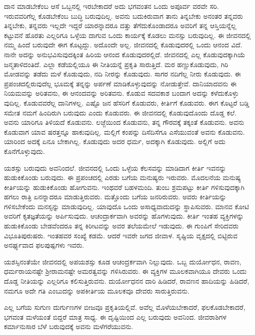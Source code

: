 ದಾನ ಮಾಡಬೇಕೆಂಬ ಆಸೆ ಒಬ್ಬನಲ್ಲಿ ಇರಬೇಕಾದರೆ ಅದು ಭಗವಂತನ ಒಂದು ಅಪೂರ್ವ ವರವೇ ಸರಿ. ಇರುವವರಿಗೆಲ್ಲ ಕೊಡಬೇಕೆಂಬ ಬುದ್ಧಿ ಬರುವುದಿಲ್ಲ. ಅವನು ಬದುಕಿರುವಾಗ ತಾನು ತಿನ್ನಬೇಕು ಅನಂತರ ತನ್ನವರು ತಿನ್ನಬೇಕು, ತನ್ನವರು ಇಲ್ಲದೇ ಇದ್ದರೆ ಯಾರನ್ನಾದರೂ ದತ್ತು ತೆಗೆದುಕೊಂಡಾದರೂ ಅವರಿಗೆ ತನ್ನ ಆಸ್ತಿಯನ್ನೆಲ್ಲ ಕಟ್ಟುವನೆ ಹೊರತು ಎಲ್ಲರಿಗೂ ಒಳ್ಳೆಯ ದಾಗುವ ಒಂದು ಕಾರ್ಯಕ್ಕೆ ಕೊಡಲು ಮನಸ್ಸು ಬರುವುದಿಲ್ಲ. ಈ ಜೀವನದಲ್ಲಿ ನಮ್ಮ ಹಿಂದೆ ಬರುವುದೇ ಈಗ ಕೊಟ್ಟದ್ದು. ಅದೊಂದೇ ಅಲ್ಲ. ಜೀವನದಲ್ಲಿ ಕೊಡುವುದರಲ್ಲಿ ಒಂದು ಆನಂದ ವಿದೆ. ನಾನೇ ಅದನ್ನು ಅನುಭವಿಸುವುದಕ್ಕಿಂತ ಹಿರಿಯ ಆನಂದ ಕೊಡುವುದರಲ್ಲಿದೆ. ಜೀವನದಲ್ಲಿ ಎಲ್ಲ ಕೊಡುವುದಕ್ಕಾಗಿಯೆ ಜನ್ಮತಾಳಿದಂತಿದೆ. ಎಲ್ಲಾ ಕಡೆಯಲ್ಲಿಯೂ ಈ ನೀತಿಯನ್ನೆ ಪ್ರಕೃತಿ ಸಾರುತ್ತಿದೆ. ಮರ ಹಣ್ಣುಕೊಡುವುದು, ಗಿರಿ ಮೋಡವನ್ನು ತಡೆದು ಮಳೆ ಕೊಡುವುದು, ನದಿ ನೀರನ್ನು ಕೊಡುವುದು. ಸಾಗರ ನದಿಗೆಲ್ಲ ನೀರು ಕೊಡುವುದು. ಈ ಪ್ರಪಂಚದಲ್ಲಿರುವುದೆಲ್ಲ ಭೂಮಕ್ಕೆ ತನ್ನನ್ನು ಅರ್ಪಣೆ ಮಾಡಿಕೊಳ್ಳುವುದನ್ನು ನೋಡುತ್ತೇವೆ. ದಾನಿಯಾದವನು ಈ ನಿಯಮವನ್ನು ಅರಿತವನು, ಈ ಆನಂದವನ್ನು ಅರಿತವನು. ಕೊಡುವ ಸದವಕಾಶ ಬಂದಾಗ ಅದನ್ನು ಕಳೆದುಕೊಳ್ಳು ವುದಿಲ್ಲ. ಕೊಡುವವರೆಲ್ಲ ದಾನಿಗಳಲ್ಲ. ಎಷ್ಟೊ ಜನ ಹೆಸರಿಗೆ ಕೊಡುವರು, ಕೀರ್ತಿಗೆ ಕೊಡುವರು. ಈಗ ಕೊಟ್ಟರೆ ಬಡ್ಡಿ ಸಮೇತ ನಮಗೆ ಹಿಂದಿರುಗಿ ಬರುವುದು ಎಂದು ಕೊಡುವರು. ಈ ಜೀವನದಲ್ಲಿ ಕೊಡುವುದೊಂದು ದೊಡ್ಡ ಕಲೆ. ಅವನು ಯಾರಿಗೂ ತಿಳಿಯದೆ ಕೊಡುವನು. ಲಜ್ಜೆಯಿಂದ ಕೊಡುವನು, ತನ್ನ ಗೌರವಕ್ಕೆ ತಕ್ಕಂತೆ ಕೊಡುವನು. ಅವನು ಕೊಡುವಾಗ ಯಾವ ಷರತ್ತನ್ನೂ ಹಾಕುವುದಿಲ್ಲ. ಮಲ್ಲಿಗೆ ಕಂಪನ್ನು ದಿಸೆದಿಸೆಗೂ ಎಸೆಯುವಂತೆ ಅವನು ಕೊಡುವನು. ಯಾರಿಂದ ಅದಕ್ಕೆ ಏನೂ ಬೇಕಾಗಿಲ್ಲ. ಕೊಡುವುದು ಅದರ ಧರ್ಮ, ಅದಕ್ಕಾಗಿ ಕೊಡುವುದು. ಅಲ್ಲಿಗೆ ಅದು ಕೊನೆಗೊಳ್ಳುವುದು.

ಯಶಸ್ಸು ಬರುವುದು ಅವನಿಂದಲೆ. ಜೀವನದಲ್ಲಿ ಒಂದು ಒಳ್ಳೆಯ ಕೆಲಸವನ್ನು ಮಾಡಿದಾಗ ಕೀರ್ತಿ ಇವನನ್ನು ಹುಡುಕಿಕೊಂಡು ಬರುವುದು. ಈ ಪ್ರಪಂಚದಲ್ಲಿ ಎರಡು ಬಗೆಯ ಮನುಷ್ಯರು ಇರುವರು. ಮೊದಲನೆಯ ಮನುಷ್ಯ ಕೀರ್ತಿಯನ್ನು ಹುಡುಕಿಕೊಂಡು ಹೋಗುವನು. ಇಂಥವರೆ ಬಹಳಮಂದಿ. ತುಂಬ ಶ್ರಮಪಟ್ಟು ಕೀರ್ತಿ ಗಳಿಸುವುದಕ್ಕಾಗಿ ಹಗಲು ರಾತ್ರಿ ಏನನ್ನಾದರೂ ಮಾಡುತ್ತಿರುವರು. ಮತ್ತೊಂದು ಬಗೆಯ ಜನರಿರುವರು. ಅವರು ಕೀರ್ತಿಯನ್ನು ಗಳಿಸಬೇಕೆಂದು ಮನಸ್ಸನ್ನು ಮಾಡುವುದಿಲ್ಲ. ಯಾವುದೊ ಒಂದು ಅಸಾಧ್ಯವಾದುದನ್ನು ಸ್ಥಾಪಿಸುವರು. ಮಾನವ ಕೋಟಿ ಅವರಿಗೆ ಕೃತಜ್ಞತೆಯನ್ನು ಅರ್ಪಿಸುವುದು. ಆಚಂದ್ರಾರ್ಕವಾಗಿ ಅವರನ್ನು ಹೊಗಳುವುದು. ಕೀರ್ತಿ ಇಂತಹ ವ್ಯಕ್ತಿಗಳನ್ನು ಹುಡುಕಿಕೊಂಡು ಬೇಡವೆಂದರೂ ತನ್ನ ಕಿರೀಟವನ್ನು ಅವರ ತಲೆಯಮೇಲೆ ಇಡುವುದು. ಈ ಗುಂಪಿಗೆ ಸೇರಿದವರು ವಿಭೂತಿಪುರುಷರು. ಇಂತಹವರ ಸಂಖ್ಯೆ ಕಡಮೆ. ಆದರೆ ಇವರೇ ಜಗದ ಜೀವಾಳ. ಸೃಷ್ಟಿಯ ವೃಕ್ಷದಲ್ಲಿ ಬಿಟ್ಟಿರುವ ಅನರ್ಘ್ಯವಾದ ಫಲಪುಷ್ಪಗಳು ಇವರು.

ಯಶಸ್ಸಿನಂತೆಯೇ ಜೀವನದಲ್ಲಿ ಅಪಯಶಸ್ಸು ಕೂಡ ಆಚಂದ್ರರ್ಕವಾಗಿ ನಿಲ್ಲುವುದು. ಒಬ್ಬ ದುರ್ಯೋಧನ, ರಾವಣ, ಧರ್ಮರಾಯನಷ್ಟೇ ಶ್ರೀರಾಮನಷ್ಟೇ ಅಮರತ್ವವನ್ನು ಗಳಿಸಿರುವರು. ಈ ವ್ಯಕ್ತಿಗಳ ಮೂಲಕವಾಗಿಯೂ ದೇವರು ಒಂದು ದೊಡ್ಡ ನೀತಿಯನ್ನು ಎಲ್ಲರಿಗೂ ಕಲಿಸುತ್ತಿರುವನು. ದುರ್ಯೋಧನನ ದಾರಿ ಹಿಡಿದರೆ, ರಾವಣನ ಹಾದಿಯನ್ನು ಹಿಡಿದರೆ, ನಮಗೂ ಅದೇ ಗತಿ ಎಂಬುದನ್ನು ಅಪಕೀರ್ತಿಯ ಮೂಲಕವೂ ದೇವರು ಸಾರುತ್ತಿರುವನು.

ಎಲ್ಲ ಬಗೆಯ ಸುಗುಣ ದುರ್ಗುಣಗಳ ಬೀಜವೂ ಪ್ರಕೃತಿಯಲ್ಲಿವೆ. ಅವೆಲ್ಲ ಮೊಳೆಯಬೇಕಾದರೆ, ಫಲಕೊಡಬೇಕಾದರೆ, ಭಗವಂತ ಮಳೆಯಂತೆ ಬಿದ್ದರೆ ಮಾತ್ರ ಸಾಧ್ಯ. ಈ ದೃಷ್ಟಿಯಿಂದ ಎಲ್ಲ ಬರುವುದು ಅವನಿಂದ. ಜೀವರಾಶಿಗಳ ಕರ್ಮಾನುಸಾರ ಬೆಳೆ ಬರುವುದಕ್ಕೆ ಅವನು ಮಳೆಗರೆಯುವನು.

